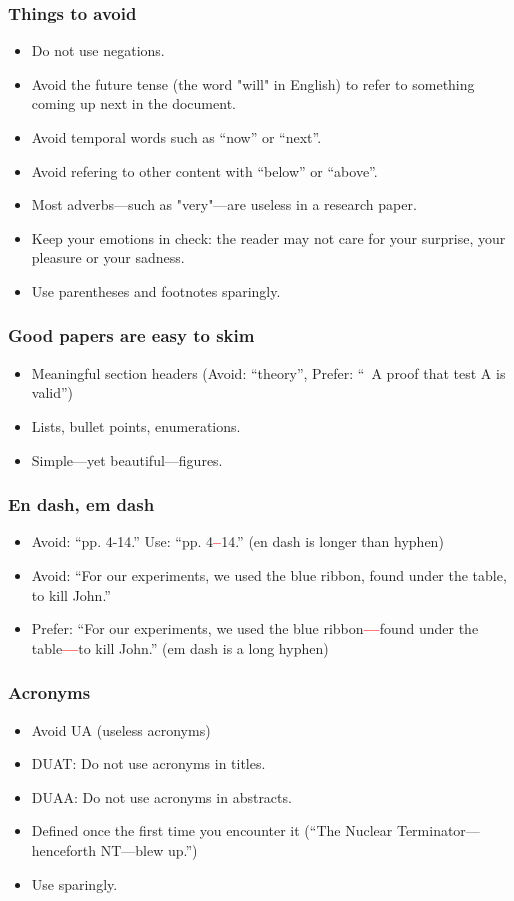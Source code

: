 \documentclass[handout]{beamer}
\newcommand{\vimportant}[1]{\textcolor{red}{\textbf{#1}}}
\begin{document}
 \frame
{
  \frametitle{Things to avoid}

 \begin{itemize}
  \item<1-> Do not use negations.
 \item<2->  Avoid the future tense (the word "will" in English) to refer to something coming up next in the document.
  \item<3->  Avoid temporal words such as ``now'' or ``next''.
  \item<3->  Avoid refering to other content with ``below'' or ``above''.
 \item<4-> Most adverbs---such as "very"---are useless in a research paper.
 \item<5-> Keep your emotions in check: the reader may not care for your surprise, your pleasure or your sadness.
 \item<6-> Use parentheses and footnotes sparingly.
 \end{itemize}
 }



\frame
{
  \frametitle{Good papers are easy to skim}

 \begin{itemize}
  \item<1->  Meaningful section headers (Avoid: ``theory'', Prefer: `` A proof that test A is valid'')
  \item<2->  Lists, bullet points, enumerations.
 \item<3->  Simple---yet beautiful---figures.
 \end{itemize}
 }
\frame
{
  \frametitle{En dash, em dash}

 \begin{itemize}
  \item<1->  Avoid: ``pp. 4-14.'' Use: ``pp. 4\vimportant{--}14.'' (en dash is longer than hyphen)
  \item<2->  Avoid: ``For our experiments, we used the blue ribbon, found under the table, to kill John.''
  \item<2->  Prefer: ``For our experiments, we used the blue ribbon\vimportant{---}found under the table\vimportant{---}to kill John.'' (em dash is a long hyphen)
 \end{itemize}
 }

\frame
{
  \frametitle{Acronyms}

 \begin{itemize}
  \item<1->  Avoid UA (useless acronyms)
  \item<2->  DUAT: Do not use acronyms in titles.
  \item<3-> DUAA: Do not use acronyms in abstracts.
  \item<4->  Defined once the first time you encounter it (``The Nuclear Terminator---henceforth NT---blew up.'')
  \item<5-> Use sparingly.
 \end{itemize}
 }
\end{document}
